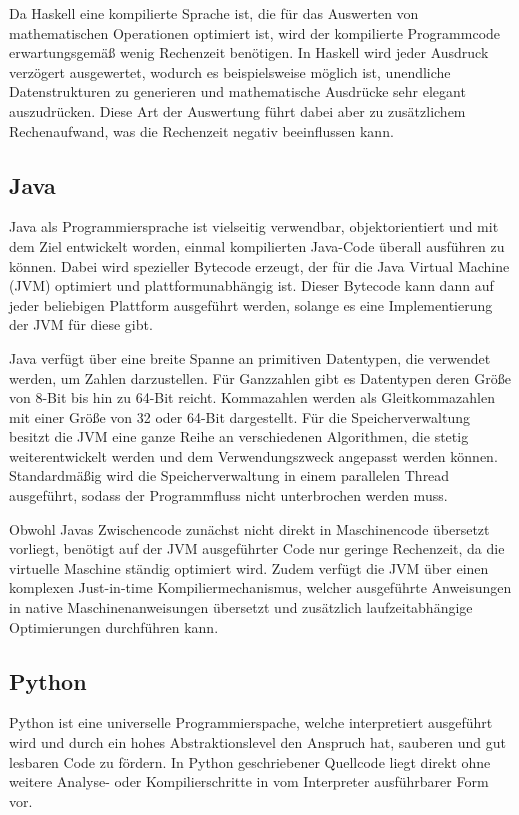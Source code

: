 \documentclass[11pt, parskip=half]{scrartcl}       %
\begin{document}
Da Haskell eine kompilierte Sprache ist, die für das Auswerten von mathematischen Operationen optimiert ist, wird der kompilierte Programmcode erwartungsgemäß wenig Rechenzeit benötigen.
In Haskell  wird jeder Ausdruck verzögert ausgewertet, wodurch es beispielsweise möglich ist, unendliche Datenstrukturen zu generieren und mathematische Ausdrücke sehr elegant auszudrücken.
Diese Art der Auswertung führt dabei aber zu zusätzlichem Rechenaufwand, was die Rechenzeit negativ beeinflussen kann.


\subsection{Java}

Java\cite{java_language} als Programmiersprache ist vielseitig verwendbar, objektorientiert und mit dem Ziel entwickelt worden, einmal kompilierten Java-Code überall ausführen zu können.
Dabei wird spezieller Bytecode erzeugt, der für die Java Virtual Machine (JVM) optimiert und plattformunabhängig ist.
Dieser Bytecode kann dann auf jeder beliebigen Plattform ausgeführt werden, solange es eine Implementierung der JVM für diese gibt.

Java verfügt über eine breite Spanne an primitiven Datentypen, die verwendet werden, um Zahlen darzustellen.
Für Ganzzahlen gibt es Datentypen deren Größe von 8-Bit bis hin zu 64-Bit reicht.
Kommazahlen werden als Gleitkommazahlen mit einer Größe von 32 oder 64-Bit dargestellt.
Für die Speicherverwaltung besitzt die JVM eine ganze Reihe an verschiedenen Algorithmen, die stetig weiterentwickelt werden und dem Verwendungszweck angepasst werden können.\cite{java_papers_garbage_collectors}
Standardmäßig wird die Speicherverwaltung in einem parallelen Thread ausgeführt, sodass der Programmfluss nicht unterbrochen werden muss.

Obwohl Javas Zwischencode zunächst nicht direkt in Maschinencode übersetzt vorliegt, benötigt auf der JVM ausgeführter Code nur geringe Rechenzeit, da die virtuelle Maschine ständig optimiert wird.
Zudem verfügt die JVM über einen komplexen Just-in-time Kompiliermechanismus, welcher ausgeführte Anweisungen in native Maschinenanweisungen übersetzt und zusätzlich laufzeitabhängige Optimierungen durchführen kann.


\subsection{Python}

Python\cite{python_language} ist eine universelle Programmierspache, welche interpretiert ausgeführt wird und durch ein hohes Abstraktionslevel den Anspruch hat, sauberen und gut lesbaren Code zu fördern.
In Python geschriebener Quellcode liegt direkt ohne weitere Analyse- oder Kompilierschritte in vom Interpreter ausführbarer Form vor.
\end{document}
